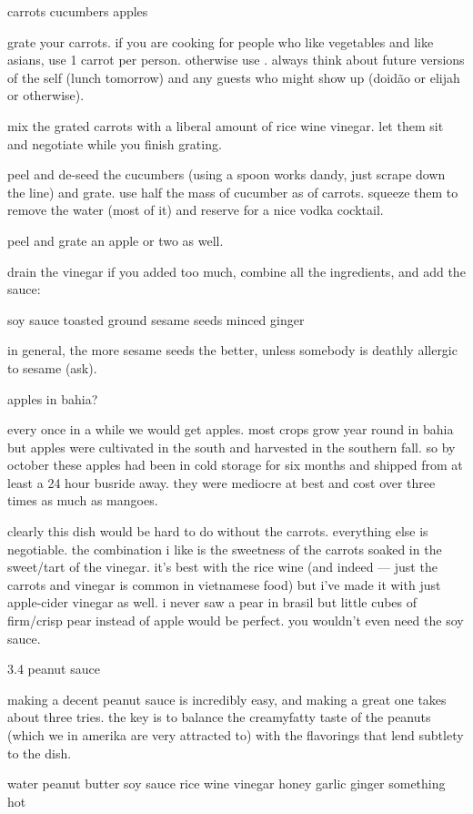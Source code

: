 carrots
cucumbers
apples

grate your carrots. if you are cooking for people who like vegetables and like asians, use 1 carrot per person. otherwise use \onehalf. always think about future versions of the self (lunch tomorrow) and any guests who might show up (doid\~{a}o or elijah or otherwise).

mix the grated carrots with a liberal amount of rice wine vinegar. let them sit and negotiate while you finish grating.

peel and de-seed the cucumbers (using a spoon works dandy, just scrape down the line) and grate. use half the mass of cucumber as of carrots. squeeze them to remove the water (most of it) and reserve for a nice vodka cocktail. 

peel and grate an apple or two as well.

drain the vinegar if you added too much, combine all the ingredients, and add the sauce:

soy sauce
toasted ground sesame seeds
minced ginger

in general, the more sesame seeds the better, unless somebody is deathly allergic to sesame (ask).

apples in bahia?

every once in a while we would get apples. most crops grow year round in bahia but apples were cultivated in the south and harvested in the southern fall. so by october these apples had been in cold storage for six months and shipped from at least a 24 hour busride away. they were mediocre at best and cost over three times as much as mangoes.

clearly this dish would be hard to do without the carrots. everything else is negotiable. the combination i like is the sweetness of the carrots soaked in the sweet/tart of the vinegar. it's best with the rice wine (and indeed --- just the carrots and vinegar is common in vietnamese food) but i've made it with just apple-cider vinegar as well. i never saw a pear in brasil but little cubes of firm/crisp pear instead of apple would be perfect. you wouldn't even need the soy sauce.

3.4  peanut sauce

making a decent peanut sauce is incredibly easy, and making a great one takes about three tries. the key is to balance the creamyfatty taste of the peanuts (which we in amerika are very attracted to) with the flavorings that lend subtlety to the dish.

water
peanut butter
soy sauce
rice wine vinegar
honey
garlic
ginger
something hot

